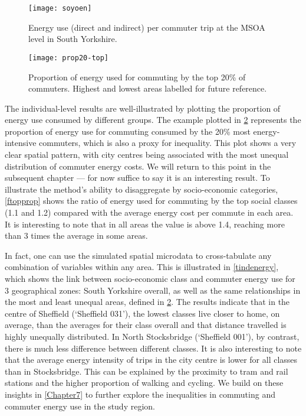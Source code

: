\begin{figure}[htbp]
\begin{center}
    \texttt{[image: soyoen]}  \end{center}
  \caption[Commuter energy use in South Yorkshire.]
  {Energy use (direct and indirect) per commuter trip at the
  MSOA level in South Yorkshire.}
 \label{fsoyoen}
\end{figure}

\begin{figure}[htbp]
\begin{center}
    \texttt{[image: prop20-top]}  \end{center}
  \caption[Proportion of energy used for commuting by the top 20\%]
  {Proportion of energy used for commuting by the top 20\% of commuters.
  Highest and lowest areas labelled for future reference.}
 \label{fineq20}
\end{figure}

The individual-level results are well-illustrated by plotting the proportion
of energy use consumed by different groups. The example plotted in
\cref{fineq20} represents the proportion of energy use for commuting
consumed by the 20\% most energy-intensive commuters, which is also a
proxy for inequality. This plot shows a very clear spatial pattern,
with city centres being associated with the most unequal distribution
of commuter energy costs. We will return to this point in the subsequent
chapter --- for now suffice to say it is an interesting result.
To illustrate the method's ability to disaggregate
by socio-economic categories, \cref{ftopprop} shows the ratio of energy
used for commuting by the top social classes (1.1 and 1.2) compared with
the average energy cost per commute in each area. It is interesting to
note that in all areas the value is above 1.4, reaching more than 3 times
the average in some areas.

In fact, one can use the simulated spatial microdata
to cross-tabulate any combination of variables within any area.
This is illustrated in \cref{tindenergy}, which shows the
link between socio-economic class and commuter energy use
for 3 geographical zones: South Yorkshire overall, as well as the same
relationships in the most and least unequal areas, defined in \cref{fineq20}.
The results indicate that in the centre of Sheffield (`Sheffield 031'),
the lowest classes live closer to home, on average, than the averages for
their class overall and that distance travelled is highly unequally distributed.
In North Stocksbridge (`Sheffield 001'), by contrast, there is much less
difference between different classes. It is also interesting to note that
the average energy intensity of trips in the city centre is lower for all
classes than in Stocksbridge. This can be explained by the proximity to
tram and rail stations and the higher proportion of walking and cycling.
We build on these insights in \cref{Chapter7} to further explore the
inequalities in commuting and commuter energy use in the study region.


